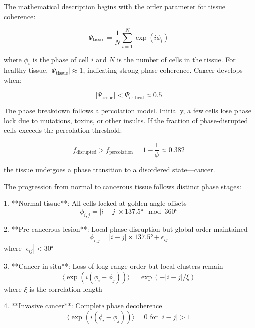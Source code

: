 \documentclass[12pt,a4paper]{report}
\begin{document}
The mathematical description begins with the order parameter for tissue coherence:

\begin{equation}
\Psi_{\text{tissue}} = \frac{1}{N} \sum_{i=1}^{N} \exp(i\phi_i)
\end{equation}

where $\phi_i$ is the phase of cell $i$ and $N$ is the number of cells in the tissue. For healthy tissue, $|\Psi_{\text{tissue}}| \approx 1$, indicating strong phase coherence. Cancer develops when:

\begin{equation}
|\Psi_{\text{tissue}}| < \Psi_{\text{critical}} \approx 0.5
\end{equation}

The phase breakdown follows a percolation model. Initially, a few cells lose phase lock due to mutations, toxins, or other insults. If the fraction of phase-disrupted cells exceeds the percolation threshold:

\begin{equation}
f_{\text{disrupted}} > f_{\text{percolation}} = 1 - \frac{1}{\phi} \approx 0.382
\end{equation}

the tissue undergoes a phase transition to a disordered state—cancer.

The progression from normal to cancerous tissue follows distinct phase stages:

1. **Normal tissue**: All cells locked at golden angle offsets
   \begin{equation}
   \phi_{i,j} = |i - j| \times 137.5° \mod 360°
   \end{equation}

2. **Pre-cancerous lesion**: Local phase disruption but global order maintained
   \begin{equation}
   \phi_{i,j} = |i - j| \times 137.5° + \epsilon_{ij}
   \end{equation}
   where $|\epsilon_{ij}| < 30°$

3. **Cancer in situ**: Loss of long-range order but local clusters remain
   \begin{equation}
   \langle \exp(i(\phi_i - \phi_j)) \rangle = \exp(-|i-j|/\xi)
   \end{equation}
   where $\xi$ is the correlation length

4. **Invasive cancer**: Complete phase decoherence
   \begin{equation}
   \langle \exp(i(\phi_i - \phi_j)) \rangle = 0 \text{ for } |i-j| > 1
   \end{equation}
\end{document}
